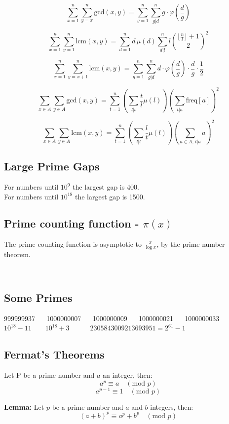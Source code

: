 $$\sum_{x = 1}^n \sum_{y = x}^n \text{gcd}(x, y) = \sum_{g = 1}^n \sum_{g|d}^n g \cdot \varphi\left(\frac{d}{g}\right)$$

$$\sum_{x = 1}^n \sum_{y = 1}^n \text{lcm}(x, y)
= \sum_{d = 1}^n d \, \mu(d) \sum_{d|l}^{n} l \binom{\lfloor \frac{n}{l} \rfloor + 1}{2}^2$$

$$\sum_{x = 1}^n \sum_{y = x+1}^n \text{lcm}(x, y) = \sum_{g = 1}^n \sum_{g|d}^n d \cdot \varphi\left(\frac{d}{g}\right) \cdot \frac{d}{g} \cdot \frac 1 2$$

$$\sum_{x \in A} \sum_{y \in A} \text{gcd}(x, y)
= \sum_{t = 1}^n \left(\sum_{l | t} \frac{t}{l} \mu(l)\right) \left(\sum_{t|a} \text{freq}[a]\right)^2$$

$$\sum_{x \in A} \sum_{y \in A} \text{lcm}(x, y)
= \sum_{t = 1}^n \left(\sum_{l | t} \frac{l}{t} \mu(l)\right) \left(\sum_{a \in A, \, t|a} a\right)^2$$

\subsection{Large Prime Gaps}
For numbers until $10^9$ the largest gap is 400.\\
For numbers until $10^{18}$ the largest gap is 1500.\\[0.5cm]

\subsection{Prime counting function - \texorpdfstring{$\pi(x)$}{}} The prime counting function is asymptotic to $\frac{x}{\log x}$, by the prime number theorem.

\ 

\subsection{Some Primes}

999999937 $\quad$ 1000000007 $\quad$ 1000000009 $\quad$ 1000000021 $\quad$ 1000000033
$10^{18} - 11 \quad\quad 10^{18} + 3 \quad\quad\quad 2305843009213693951 = 2^{61} - 1$

\subsection{Fermat's Theorems}
Let P be a prime number and $a$ an integer, then:
$$a^p \equiv a \quad (\text{mod } p)$$
$$a^{p-1} \equiv 1 \quad (\text{mod } p)$$

\textbf{Lemma:} Let $p$ be a prime number and $a$ and $b$ integers, then: 
$$(a+b)^{p} \equiv a^{p} + b^{p} \quad (\text{mod } p)$$

